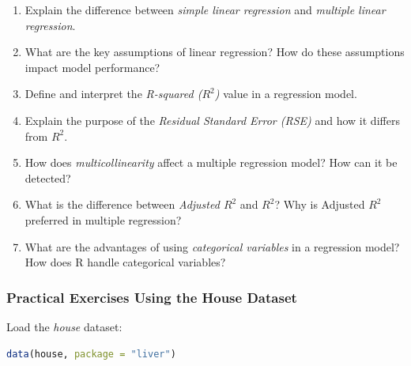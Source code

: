 \documentclass[
  11pt,
]{book}
\providecommand{\tightlist}{%
  \setlength{\itemsep}{0pt}\setlength{\parskip}{0pt}}
\theoremstyle{definition}
\theoremstyle{definition}
\theoremstyle{definition}
\theoremstyle{definition}
\theoremstyle{remark}
\begin{document}
\begin{enumerate}
\def\labelenumi{\arabic{enumi}.}
\tightlist
\item
  Explain the difference between \emph{simple linear regression} and \emph{multiple linear regression}.\\
\item
  What are the key assumptions of linear regression? How do these assumptions impact model performance?\\
\item
  Define and interpret the \emph{R-squared (\(R^2\))} value in a regression model.\\
\item
  Explain the purpose of the \emph{Residual Standard Error (RSE)} and how it differs from \(R^2\).\\
\item
  How does \emph{multicollinearity} affect a multiple regression model? How can it be detected?\\
\item
  What is the difference between \emph{Adjusted \(R^2\)} and \emph{\(R^2\)}? Why is Adjusted \(R^2\) preferred in multiple regression?
\item
  What are the advantages of using \emph{categorical variables} in a regression model? How does R handle categorical variables?
\end{enumerate}

\subsubsection*{Practical Exercises Using the House Dataset}\label{practical-exercises-using-the-house-dataset}


Load the \emph{house} dataset:

\begin{lstlisting}[language=R]
data(house, package = "liver")
\end{lstlisting}
\end{document}
